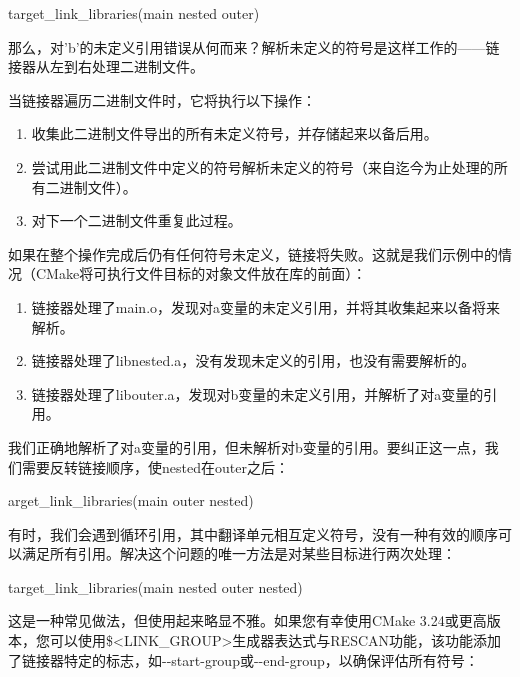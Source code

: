 \begin{cmake}
target_link_libraries(main nested outer)
\end{cmake}

那么，对’b’的未定义引用错误从何而来？解析未定义的符号是这样工作的——链接器从左到右处理二进制文件。

当链接器遍历二进制文件时，它将执行以下操作：

\begin{enumerate}
\item
收集此二进制文件导出的所有未定义符号，并存储起来以备后用。

\item
尝试用此二进制文件中定义的符号解析未定义的符号（来自迄今为止处理的所有二进制文件）。

\item
对下一个二进制文件重复此过程。
\end{enumerate}

如果在整个操作完成后仍有任何符号未定义，链接将失败。这就是我们示例中的情况（CMake将可执行文件目标的对象文件放在库的前面）：

\begin{enumerate}
\item
链接器处理了main.o，发现对a变量的未定义引用，并将其收集起来以备将来解析。

\item
链接器处理了libnested.a，没有发现未定义的引用，也没有需要解析的。

\item
链接器处理了libouter.a，发现对b变量的未定义引用，并解析了对a变量的引用。
\end{enumerate}

我们正确地解析了对a变量的引用，但未解析对b变量的引用。要纠正这一点，我们需要反转链接顺序，使nested在outer之后：

\begin{cmake}
arget_link_libraries(main outer nested)
\end{cmake}

有时，我们会遇到循环引用，其中翻译单元相互定义符号，没有一种有效的顺序可以满足所有引用。解决这个问题的唯一方法是对某些目标进行两次处理：

\begin{cmake}
target_link_libraries(main nested outer nested)
\end{cmake}

这是一种常见做法，但使用起来略显不雅。如果您有幸使用CMake 3.24或更高版本，您可以使用\$<LINK\_GROUP>生成器表达式与RESCAN功能，该功能添加了链接器特定的标志，如-{}-start-group或-{}-end-group，以确保评估所有符号：

